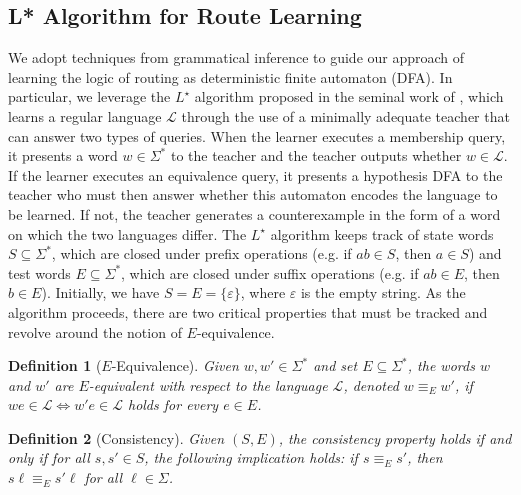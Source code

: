 \documentclass[journal]{IEEEtai}
\begin{document}
\subsection{L* Algorithm for Route Learning}
\label{sec:lstar}

We adopt techniques from grammatical inference to guide our approach of learning the logic of routing as deterministic finite automaton (DFA). In particular, we leverage the $L^\star$ algorithm proposed in the seminal work of \cite{Angluin87}, which learns a regular language $\mathcal{L}$ through the use of a minimally adequate teacher that can answer two types of queries. When the learner executes a membership query, it presents a word $w \in \Sigma^*$ to the teacher and the teacher outputs whether $w \in \mathcal{L}$.
If the learner executes an equivalence query, it presents a hypothesis DFA to the teacher who must then answer whether this automaton encodes the language to be learned.
If not, the teacher generates a counterexample in the form of a word on which the two languages differ.
The $L^\star$ algorithm keeps track of state words $S \subseteq \Sigma^*$, which are closed under prefix operations (e.g. if $ab \in S$, then $a \in S$) and test words $E \subseteq \Sigma^*$, which are closed under suffix operations (e.g. if $ab \in E$, then $b \in E$).
Initially, we have $S = E = \{\varepsilon\}$, where $\varepsilon$ is the empty string.
As the algorithm proceeds, there are two critical properties that must be tracked and revolve around the notion of $E$-equivalence.

\newtheorem{definition}{Definition}[section] %


\begin{definition}[$E$-Equivalence]
Given $w, w' \in \Sigma^*$ and set $E \subseteq \Sigma^*$, the words $w$ and $w'$ are $E$-equivalent with respect to the language $\mathcal{L}$, denoted $w \equiv_E w'$, if $w  e \in \mathcal{L} \iff w'  e \in \mathcal{L}$ holds for every $e \in E$.
\end{definition}


\begin{definition}[Consistency]
Given $(S, E)$, the consistency property holds if and only if for all $s, s' \in S$, the following implication holds: if $s \equiv_E s'$, then $s \ell \equiv_E s' \ell$ for all $\ell \in \Sigma$.

\end{definition}
\end{document}
